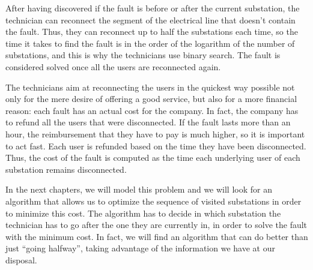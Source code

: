 After having discovered if the fault is before or after the current substation, the technician can reconnect the segment of the electrical line that doesn't contain the fault. Thus, they can reconnect up to half the substations each time, so the time it takes to find the fault is in the order of the logarithm of the number of substations, and this is why the technicians use binary search. The fault is considered solved once all the users are reconnected again.

The technicians aim at reconnecting the users in the quickest way possible not only for the mere desire of offering a good service, but also for a more financial reason: each fault has an actual cost for the company. In fact, the company has to refund all the users that were disconnected. If the fault lasts more than an hour, the reimbursement that they have to pay is much higher, so it is important to act fast. Each user is refunded based on the time they have been disconnected. Thus, the cost of the fault is computed as the time each underlying user of each substation remains disconnected.

In the next chapters, we will model this problem and we will look for an algorithm that allows us to optimize the sequence of visited substations in order to minimize this cost. The algorithm has to decide in which substation the technician has to go after the one they are currently in, in order to solve the fault with the minimum cost. In fact, we will find an algorithm that can do better than just ``going halfway'', taking advantage of the information we have at our disposal.